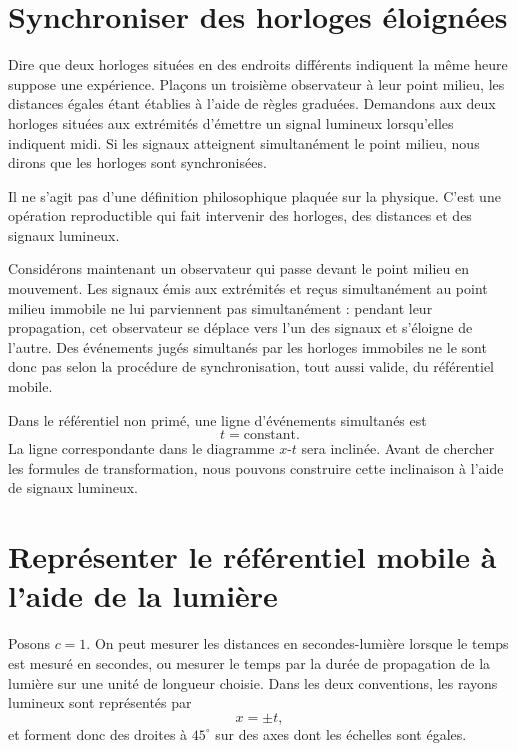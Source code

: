 \section{Synchroniser des horloges éloignées}

Dire que deux horloges situées en des endroits différents indiquent la même heure suppose une expérience. Plaçons un troisième observateur à leur point milieu, les distances égales étant établies à l’aide de règles graduées. Demandons aux deux horloges situées aux extrémités d’émettre un signal lumineux lorsqu’elles indiquent midi. Si les signaux atteignent simultanément le point milieu, nous dirons que les horloges sont synchronisées.

Il ne s’agit pas d’une définition philosophique plaquée sur la physique. C’est une opération reproductible qui fait intervenir des horloges, des distances et des signaux lumineux.

Considérons maintenant un observateur qui passe devant le point milieu en mouvement. Les signaux émis aux extrémités et reçus simultanément au point milieu immobile ne lui parviennent pas simultanément : pendant leur propagation, cet observateur se déplace vers l’un des signaux et s’éloigne de l’autre. Des événements jugés simultanés par les horloges immobiles ne le sont donc pas selon la procédure de synchronisation, tout aussi valide, du référentiel mobile.

Dans le référentiel non primé, une ligne d’événements simultanés est
\begin{equation}
t=\text{constant}.
\end{equation}
La ligne correspondante dans le diagramme \(x\)-\(t\) sera inclinée. Avant de chercher les formules de transformation, nous pouvons construire cette inclinaison à l’aide de signaux lumineux.

\section{Représenter le référentiel mobile à l’aide de la lumière}

Posons \(c=1\). On peut mesurer les distances en secondes-lumière lorsque le temps est mesuré en secondes, ou mesurer le temps par la durée de propagation de la lumière sur une unité de longueur choisie. Dans les deux conventions, les rayons lumineux sont représentés par
\begin{equation}
x=\pm t,
\label{eq:sr1-light-units}
\end{equation}
et forment donc des droites à \(45^\circ\) sur des axes dont les échelles sont égales.

